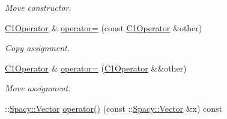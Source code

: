 \begin{DoxyCompactItemize}
\begin{DoxyCompactList}\small\item\em Move constructor. \end{DoxyCompactList}\item 
\hyperlink{classSpacy_1_1FEniCS_1_1C1Operator}{C1\+Operator} \& \hyperlink{classSpacy_1_1FEniCS_1_1C1Operator_a1e74d332b9cb30ed83d757a39453c47c_a1e74d332b9cb30ed83d757a39453c47c}{operator=} (const \hyperlink{classSpacy_1_1FEniCS_1_1C1Operator}{C1\+Operator} \&other)
\begin{DoxyCompactList}\small\item\em Copy assignment. \end{DoxyCompactList}\item 
\hyperlink{classSpacy_1_1FEniCS_1_1C1Operator}{C1\+Operator} \& \hyperlink{classSpacy_1_1FEniCS_1_1C1Operator_ae611721c1f172413877c91a3e99ae69b_ae611721c1f172413877c91a3e99ae69b}{operator=} (\hyperlink{classSpacy_1_1FEniCS_1_1C1Operator}{C1\+Operator} \&\&other)
\begin{DoxyCompactList}\small\item\em Move assignment. \end{DoxyCompactList}\item 
\hypertarget{classSpacy_1_1FEniCS_1_1C1Operator_a5e2b3831a7583793f6c134eedd2be9bc}{}\+::\hyperlink{classSpacy_1_1Vector}{Spacy\+::\+Vector} \hyperlink{classSpacy_1_1FEniCS_1_1C1Operator_a5e2b3831a7583793f6c134eedd2be9bc}{operator()} (const \+::\hyperlink{classSpacy_1_1Vector}{Spacy\+::\+Vector} \&x) const \label{classSpacy_1_1FEniCS_1_1C1Operator_a5e2b3831a7583793f6c134eedd2be9bc}


\end{DoxyCompactItemize}
